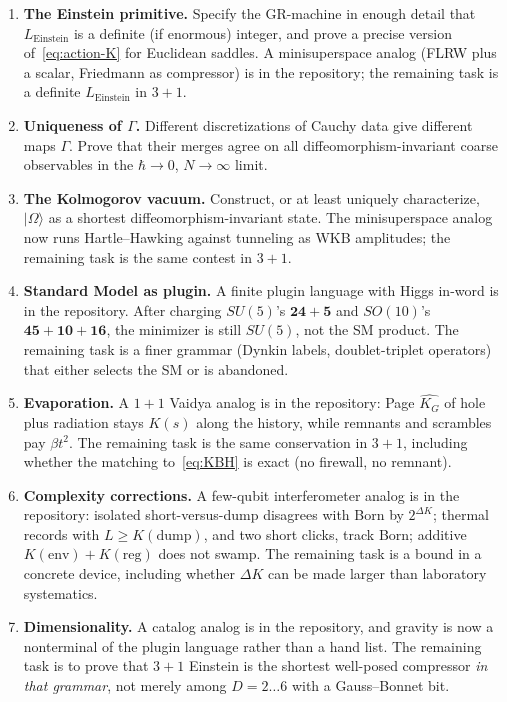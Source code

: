 \documentclass[11pt,a4paper]{article}
\theoremstyle{plain}
\theoremstyle{definition}
\theoremstyle{remark}
\newcommand{\KG}{K_{G}}
\newcommand{\ket}[1]{\lvert#1\rangle}
\begin{document}
\begin{enumerate}
  \item \textbf{The Einstein primitive.}
  Specify the GR-machine in enough detail that $L_{\mathrm{Einstein}}$ is a definite (if enormous) integer, and prove a precise version of~\eqref{eq:action-K} for Euclidean saddles.
  A minisuperspace analog (FLRW plus a scalar, Friedmann as compressor) is in the repository; the remaining task is a definite $L_{\mathrm{Einstein}}$ in $3{+}1$.

  \item \textbf{Uniqueness of $\Gamma$.}
  Different discretizations of Cauchy data give different maps $\Gamma$.
  Prove that their merges agree on all diffeomorphism-invariant coarse observables in the $\hbar\to 0$, $N\to\infty$ limit.

  \item \textbf{The Kolmogorov vacuum.}
  Construct, or at least uniquely characterize, $\ket{\Omega}$ as a shortest diffeomorphism-invariant state.
  The minisuperspace analog now runs Hartle--Hawking against tunneling as WKB amplitudes; the remaining task is the same contest in $3{+}1$.

  \item \textbf{Standard Model as plugin.}
  A finite plugin language with Higgs in-word is in the repository.
  After charging $SU(5)$'s $\mathbf{24}{+}\mathbf{5}$ and $SO(10)$'s $\mathbf{45}{+}\mathbf{10}{+}\mathbf{16}$, the minimizer is still $SU(5)$, not the SM product.
  The remaining task is a finer grammar (Dynkin labels, doublet-triplet operators) that either selects the SM or is abandoned.

  \item \textbf{Evaporation.}
  A $1{+}1$ Vaidya analog is in the repository: Page $\widehat{\KG}$ of hole plus radiation stays $K(s)$ along the history, while remnants and scrambles pay $\beta t^{2}$.
  The remaining task is the same conservation in $3{+}1$, including whether the matching to~\eqref{eq:KBH} is exact (no firewall, no remnant).

  \item \textbf{Complexity corrections.}
  A few-qubit interferometer analog is in the repository: isolated short-versus-dump disagrees with Born by $2^{\Delta K}$; thermal records with $L\ge K(\mathrm{dump})$, and two short clicks, track Born; additive $K(\mathrm{env})+K(\mathrm{reg})$ does not swamp.
  The remaining task is a bound in a concrete device, including whether $\Delta K$ can be made larger than laboratory systematics.

  \item \textbf{Dimensionality.}
  A catalog analog is in the repository, and gravity is now a nonterminal of the plugin language rather than a hand list.
  The remaining task is to prove that $3{+}1$ Einstein is the shortest well-posed compressor \emph{in that grammar}, not merely among $D=2{\ldots}6$ with a Gauss--Bonnet bit.
\end{enumerate}
\end{document}
